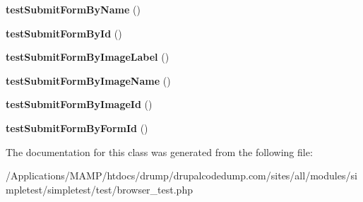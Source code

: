 \begin{DoxyCompactItemize}
\item 
\hypertarget{class_test_of_browser_navigation_a769049c6b8e87df5ed1a2513f54c8f49}{
{\bfseries testSubmitFormByName} ()}
\label{class_test_of_browser_navigation_a769049c6b8e87df5ed1a2513f54c8f49}

\item 
\hypertarget{class_test_of_browser_navigation_adafbbbfbb42d142acd5233f1d53d509a}{
{\bfseries testSubmitFormById} ()}
\label{class_test_of_browser_navigation_adafbbbfbb42d142acd5233f1d53d509a}

\item 
\hypertarget{class_test_of_browser_navigation_a6f9a33bb03ae608b28a5809143cce356}{
{\bfseries testSubmitFormByImageLabel} ()}
\label{class_test_of_browser_navigation_a6f9a33bb03ae608b28a5809143cce356}

\item 
\hypertarget{class_test_of_browser_navigation_a597c0eea660ff18c8e3ac5b5de8871bc}{
{\bfseries testSubmitFormByImageName} ()}
\label{class_test_of_browser_navigation_a597c0eea660ff18c8e3ac5b5de8871bc}

\item 
\hypertarget{class_test_of_browser_navigation_a6331804fce02a26828d70ef2baa2dee5}{
{\bfseries testSubmitFormByImageId} ()}
\label{class_test_of_browser_navigation_a6331804fce02a26828d70ef2baa2dee5}

\item 
\hypertarget{class_test_of_browser_navigation_a503a1987f9d46820fcc7bb9cb430a6f1}{
{\bfseries testSubmitFormByFormId} ()}
\label{class_test_of_browser_navigation_a503a1987f9d46820fcc7bb9cb430a6f1}

\end{DoxyCompactItemize}


The documentation for this class was generated from the following file:\begin{DoxyCompactItemize}
\item 
/Applications/MAMP/htdocs/drump/drupalcodedump.com/sites/all/modules/simpletest/simpletest/test/browser\_\-test.php\end{DoxyCompactItemize}
